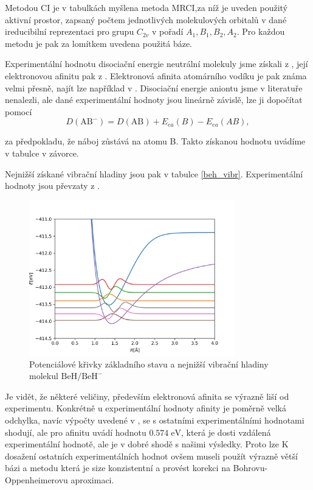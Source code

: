 Metodou CI je v tabulkách myšlena metoda MRCI,za níž je uveden použitý aktivní prostor, 
zapsaný počtem jednotlivých molekulových orbitalů v dané ireducibilní reprezentaci pro grupu 
 $C_{2v}$ v pořadí $A_1, B_1, B_2, A_2$. Pro každou metodu je pak za lomítkem uvedena použitá báze.

Experimentální hodnotu disociační energie neutrální molekuly jsme získali 
z \cite{BeH-LeRoy}, její elektronovou afinitu pak z \cite{BeH-ElAf}. Elektronová 
afinita atomárního vodíku je pak známa velmi přesně, 
najít lze například v \cite{H-ElAf}. Disociační energie aniontu jsme 
v literatuře nenalezli, ale dané experimentální hodnoty jsou lineárně závislě, 
lze ji dopočítat pomocí
\begin{equation}
D(\mathrm{AB^-}) = D(\mathrm{AB}) + E_{ea}(B) - E_{ea}(AB),
\end{equation}

za předpokladu, že náboj zůstává na atomu B. Takto získanou hodnotu uvádíme v tabulce v závorce.

Nejnižší získané vibrační hladiny jsou pak v tabulce \ref{beh_vibr}.
Experimentální hodnoty jsou převzaty z \cite{BeH-LeRoy}.

\begin{figure}
\centering
\includegraphics[width=0.8\textwidth]{../img/BeH-vibr1.png}
\caption{Potenciálové křivky základního stavu a nejnižší vibrační hladiny molekul $\mathrm{BeH/BeH^-}$}
\label{VibrBeH1}
\end{figure}

Je vidět, že některé veličiny, především elektronová afinita se výrazně liší od 
experimentu. Konkrétně u experimentální hodnoty afinity je poměrně velká odchylka, 
navíc výpočty uvedené v \cite{KoputBeH, Koput_BeHan}, se s ostatními experimentálními hodnotami 
shodují, ale pro afinitu uvádí hodnotu $0.574\;\mathrm{eV}$, která je dosti vzdálená 
experimentální hodnotě, ale je v dobré shodě s našimi výsledky. Proto lze 
K dosažení ostatních experimentálních hodnot ovšem museli použít výrazně větší bázi a 
metodu která je size konzistentní a provést korekci na Bohrovu-Oppenheimerovu 
aproximaci. 

